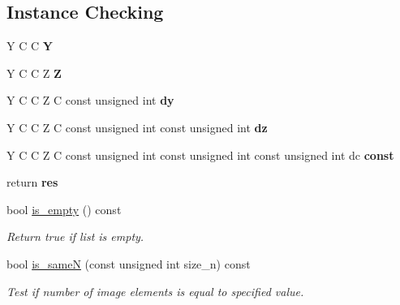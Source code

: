 \subsection*{Instance Checking}
\begin{DoxyCompactItemize}
\item 
\mbox{\label{structcimg__library__suffixed_1_1CImgList_aeb5664694c867337058da90628ad710f}} 
Y C C {\bfseries Y}
\item 
\mbox{\label{structcimg__library__suffixed_1_1CImgList_a5fbab9a9b8a745a7bbccc6887f7b98bf}} 
Y C C Z {\bfseries Z}
\item 
\mbox{\label{structcimg__library__suffixed_1_1CImgList_a7819c014726df1f1a909e2808a2a8ba2}} 
Y C C Z C const unsigned int {\bfseries dy}
\item 
\mbox{\label{structcimg__library__suffixed_1_1CImgList_a9ff6d53b3cc0c63ffb3d05cb0b60c3ee}} 
Y C C Z C const unsigned int const unsigned int {\bfseries dz}
\item 
Y C C Z C const unsigned int const unsigned int const unsigned int dc {\bfseries const}
\item 
\mbox{\label{structcimg__library__suffixed_1_1CImgList_a7c543742144a3cd28f3a5addd913ca2b}} 
return {\bfseries res}
\item 
\mbox{\label{structcimg__library__suffixed_1_1CImgList_ae1f51c42341873aebaa428e522eed8c6}} 
bool \hyperlink{structcimg__library__suffixed_1_1CImgList_ae1f51c42341873aebaa428e522eed8c6}{is\+\_\+empty} () const
\begin{DoxyCompactList}\small\item\em Return {\ttfamily true} if list is empty. \end{DoxyCompactList}\item 
bool \hyperlink{structcimg__library__suffixed_1_1CImgList_aca539b475d1948761f94bd98694ccd4a}{is\+\_\+sameN} (const unsigned int size\+\_\+n) const
\begin{DoxyCompactList}\small\item\em Test if number of image elements is equal to specified value. \end{DoxyCompactList}\item 

\end{DoxyCompactItemize}

